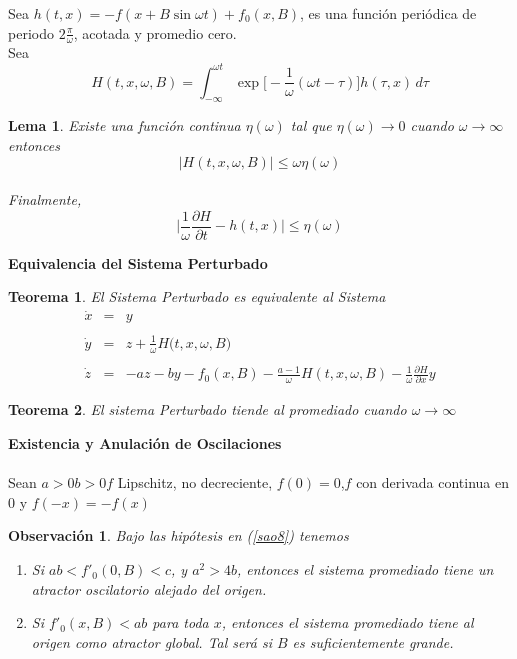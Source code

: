 \documentclass[letter]{article}
\newtheorem{obs}{Observaci{\'o}n}
\newtheorem{theo}{Teorema}
\newtheorem{lem}{Lema}
\begin{document}
Sea $h(t, x)=-f(x+B\sin\omega t)+f_0(x,B)$, es una funci{\'o}n
peri{\'o}dica de pe\-riodo $2\displaystyle{\frac{\pi}{\omega}}$,
acotada y promedio cero.
\\
Sea
\begin{equation}\label{ea6.1}
H(t,x,\omega,B)=\int_{-\infty}^{ \omega
t}\exp\Big[-\displaystyle{\frac{1}{\omega}}(\omega
t-\tau)\Big]h(\tau,x)\, d\tau
\end{equation}
\begin{lem}\label{la1}
Existe una funci{\'o}n continua $\eta(\omega)$ tal que
$\eta(\omega)\rightarrow0$ cuando $\omega\rightarrow\infty$\\
entonces
\begin{equation}\label{ea6.2}
|H(t,x,\omega,B)|\leq \omega\eta(\omega)
\end{equation}
\\
Finalmente,
\\
\begin{equation}\label{ea6.3}
\Big|\displaystyle{\frac{1}{\omega}\frac{\partial H}{\partial t}
}-h(t,x)\Big|\leq \eta(\omega)
\end{equation}
\end{lem}
\newpage
{\bf\Large{Equivalencia del Sistema Perturbado}}
\begin{theo}\label{P621} El Sistema Perturbado es equivalente al Sistema
\\
\begin{equation}\label{PP6621}
\begin{array}{lcl}
\dot{x}&=&y\\&&\\
\dot{y}&=&z+\displaystyle{\frac{1}{\omega}}H\Big(
t,x,\omega, B\Big)\\&&\\
\dot{z}&=&-az-by-f_0(x,B)-\displaystyle{\frac{a-1}{\omega}}H(t,x,\omega,B)-
\displaystyle{\frac{1}{\omega}\frac{\partial H}{\partial x}}y
\end{array}
\end{equation}
\end{theo}
\begin{theo}\label{N61}El sistema Perturbado tiende al promediado cuando
$\omega \rightarrow\infty $
\end{theo}
{\bf\Large{Existencia y Anulaci{\'o}n de Oscilaciones}}
\\
\\
Sean $a>0$\quad $b>0$\quad $f$ Lipschitz, no decreciente,\quad
$f(0)=0$,\quad $f$ con derivada continua en 0 y $f(-x)=-f(x)$
\begin{obs}Bajo las hip{\'o}tesis en (\ref{sao8}) tenemos
\begin{enumerate}\item[a)] Si
$ab<f'_0(0,B)<c$, y $a^2>4b$, entonces el sistema promediado tiene
un atractor oscilatorio alejado del origen.
\\
\item[b)]Si  $f'_0(x,B)<ab$ para toda $x$, entonces  el sistema
promediado tiene al origen como atractor global. Tal ser{\'a} si $B$
es suficientemente grande.
\end{enumerate}
\end{obs}
\end{document}

